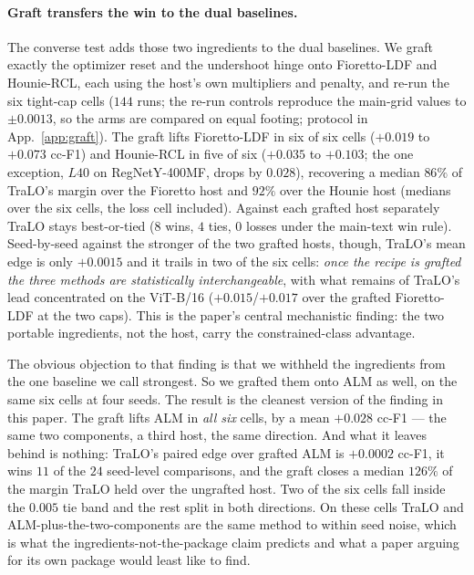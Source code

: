 \documentclass[10pt]{article}
\begin{document}
\paragraph{Graft transfers the win to the dual baselines.}
The converse test adds those two ingredients to the dual baselines. We
graft exactly the optimizer reset and the undershoot hinge onto
Fioretto-LDF and Hounie-RCL, each using the host's own multipliers and
penalty, and re-run the six tight-cap cells{ ($144$ runs; the re-run controls reproduce the main-grid
values to $\pm0.0013$, so the arms are compared on equal footing; protocol in
App.~\ref{app:graft}).} The graft lifts Fioretto-LDF in six of six cells ($+0.019$ to
$+0.073$ cc-F1) and Hounie-RCL in five of six ($+0.035$ to $+0.103$; the
one exception, $L40$ on RegNet{Y-400MF}, drops by $0.028$), recovering a median
$86\%$ of TraLO's margin over the Fioretto host and $92\%$ over the
Hounie host (medians over the six cells, the loss cell included). Against
each grafted host separately TraLO stays best-or-tied ($8$ wins, $4$
ties, $0$ losses under the main-text win rule). Seed-by-seed against the
stronger of the two grafted hosts, though, TraLO's mean edge is only
$+0.0015$ and it trails in two of the six cells: \emph{once the recipe is
grafted the three methods are statistically interchangeable}, with what
remains of TraLO's lead concentrated on the ViT-B/16 ($+0.015$/$+0.017$
over the grafted Fioretto-LDF at the two caps). This is the paper's
central mechanistic finding: the two portable ingredients, not the host,
carry the constrained-class advantage.

{
The obvious objection to that finding is that we withheld the ingredients from
the one baseline we call strongest. So we grafted them onto ALM as well, on the
same six cells at four seeds. The result is the cleanest version of the finding
in this paper. The graft lifts ALM in \emph{all six} cells, by a mean $+0.028$
cc-F1 --- the same two components, a third host, the same direction. And what it
leaves behind is nothing: TraLO's paired edge over grafted ALM is $+0.0002$
cc-F1, it wins $11$ of the $24$ seed-level comparisons, and the graft closes a
median $126\%$ of the margin TraLO held over the ungrafted host. Two of the six
cells fall inside the $0.005$ tie band and the rest split in both directions.
On these cells TraLO and ALM-plus-the-two-components are the same method to
within seed noise, which is what the ingredients-not-the-package claim predicts
and what a paper arguing for its own package would least like to find.}
\end{document}
